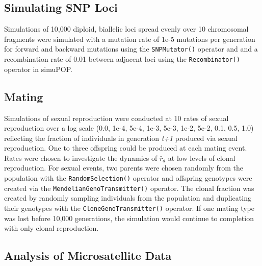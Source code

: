 \documentclass[]{article}
\theoremstyle{definition}
\theoremstyle{definition}
\theoremstyle{remark}
\begin{document}
\subsection{Simulating SNP Loci}\label{simulating-snp-loci}

Simulations of 10,000 diploid, biallelic loci spread evenly over 10
chromosomal fragments were simulated with a mutation rate of 1e-5
mutations per generation for forward and backward mutations using the
\texttt{SNPMutator()} operator and and a recombination rate of 0.01
between adjacent loci using the \texttt{Recombinator()} operator in
simuPOP.

\subsection{Mating}\label{mating}

Simulations of sexual reproduction were conducted at 10 rates of sexual
reproduction over a log scale (0.0, 1e-4, 5e-4, 1e-3, 5e-3, 1e-2, 5e-2,
0.1, 0.5, 1.0) reflecting the fraction of individuals in generation
\emph{t+1} produced via sexual reproduction. One to three offspring
could be produced at each mating event. Rates were chosen to investigate
the dynamics of \(\bar{r}_d\) at low levels of clonal reproduction. For
sexual events, two parents were chosen randomly from the population with
the \texttt{RandomSelection()} operator and offspring genotypes were
created via the \texttt{MendelianGenoTransmitter()} operator. The clonal
fraction was created by randomly sampling individuals from the
population and duplicating their genotypes with the
\texttt{CloneGenoTransmitter()} operator. If one mating type was lost
before 10,000 generations, the simulation would continue to completion
with only clonal reproduction.

\subsection{Analysis of Microsatellite
Data}\label{analysis-of-microsatellite-data}
\end{document}
